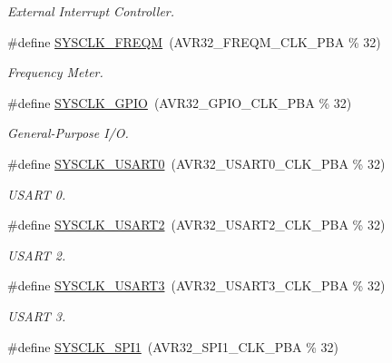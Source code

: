 \begin{DoxyCompactItemize}
\begin{DoxyCompactList}\small\item\em \-External \-Interrupt \-Controller. \end{DoxyCompactList}\item 
\#define \hyperlink{group__sysclk__group_ga0bd4c7581ed295f5202efa0631dfe1aa}{\-S\-Y\-S\-C\-L\-K\-\_\-\-F\-R\-E\-Q\-M}~(\-A\-V\-R32\-\_\-\-F\-R\-E\-Q\-M\-\_\-\-C\-L\-K\-\_\-\-P\-B\-A \% 32)
\begin{DoxyCompactList}\small\item\em \-Frequency \-Meter. \end{DoxyCompactList}\item 
\#define \hyperlink{group__sysclk__group_gaafd65ced01805e6f5dfbd3b08e9aa02c}{\-S\-Y\-S\-C\-L\-K\-\_\-\-G\-P\-I\-O}~(\-A\-V\-R32\-\_\-\-G\-P\-I\-O\-\_\-\-C\-L\-K\-\_\-\-P\-B\-A \% 32)
\begin{DoxyCompactList}\small\item\em \-General-\/\-Purpose \-I/\-O. \end{DoxyCompactList}\item 
\#define \hyperlink{group__sysclk__group_gaeeea970aa1d68f0726f6ac7b19882491}{\-S\-Y\-S\-C\-L\-K\-\_\-\-U\-S\-A\-R\-T0}~(\-A\-V\-R32\-\_\-\-U\-S\-A\-R\-T0\-\_\-\-C\-L\-K\-\_\-\-P\-B\-A \% 32)
\begin{DoxyCompactList}\small\item\em \-U\-S\-A\-R\-T 0. \end{DoxyCompactList}\item 
\#define \hyperlink{group__sysclk__group_gae2bb545878e7dc4040c1b1e9bab34cdd}{\-S\-Y\-S\-C\-L\-K\-\_\-\-U\-S\-A\-R\-T2}~(\-A\-V\-R32\-\_\-\-U\-S\-A\-R\-T2\-\_\-\-C\-L\-K\-\_\-\-P\-B\-A \% 32)
\begin{DoxyCompactList}\small\item\em \-U\-S\-A\-R\-T 2. \end{DoxyCompactList}\item 
\#define \hyperlink{group__sysclk__group_ga749a1c474f6bcdfb0c71e76d88371572}{\-S\-Y\-S\-C\-L\-K\-\_\-\-U\-S\-A\-R\-T3}~(\-A\-V\-R32\-\_\-\-U\-S\-A\-R\-T3\-\_\-\-C\-L\-K\-\_\-\-P\-B\-A \% 32)
\begin{DoxyCompactList}\small\item\em \-U\-S\-A\-R\-T 3. \end{DoxyCompactList}\item 
\#define \hyperlink{group__sysclk__group_ga2981d1f5ff381253d3ca94c260bbba01}{\-S\-Y\-S\-C\-L\-K\-\_\-\-S\-P\-I1}~(\-A\-V\-R32\-\_\-\-S\-P\-I1\-\_\-\-C\-L\-K\-\_\-\-P\-B\-A \% 32)

\end{DoxyCompactItemize}
